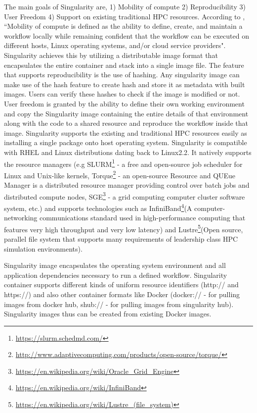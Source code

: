 The main goals of Singularity are, 1) Mobility of compute 2) Reproducibility 3) User Freedom 4) Support on existing traditional HPC resources. According to \cite{10.1371/journal.pone.0177459}, ``Mobility of compute is defined as the ability to define, create, and maintain a workflow locally while remaining confident that the workflow can be executed on different hosts, Linux operating systems, and/or cloud service providers". Singularity achieves this by utilizing a distributable image format that encapsulates the entire container and stack into a single image file. The feature that supports reproducibility is the use of hashing. Any singularity image can make use of the hash feature to create hash and store it as metadata with built images. Users can verify these hashes to check if the image is modified or not. User freedom is granted by the ability to define their own working environment and copy the Singularity image containing the entire details of that environment along with the code to a shared resource and reproduce the workflow inside that image. Singularity supports the existing and traditional HPC resources easily as installing a single package onto host operating system. Singularity is compatible with RHEL and Linux distributions dating back to Linux2.2. It natively supports the resource managers (e.g SLURM\footnote{\url{https://slurm.schedmd.com/}} - a free and open-source job scheduler for Linux and Unix-like kernels, Torque\footnote{\url{http://www.adaptivecomputing.com/products/open-source/torque/}} - an open-source Resource and QUEue Manager is a distributed resource manager providing control over batch jobs and distributed compute nodes, SGE\footnote{\url{https://en.wikipedia.org/wiki/Oracle_Grid_Engine}} - a grid computing computer cluster software system, etc.) and supports technologies such as InfiniBand\footnote{\url{https://en.wikipedia.org/wiki/InfiniBand}}(A computer-networking communications standard used in high-performance computing that features very high throughput and very low latency) and Lustre\footnote{\url{https://en.wikipedia.org/wiki/Lustre_(file_system)}}(Open source, parallel file system that supports many requirements of leadership class HPC simulation environments).

Singularity image encapsulates the operating system environment and all application dependencies necessary to run a defined workflow. Singularity container supports different kinds of uniform resource identifiers (http:// and https://) and also other container formats like Docker (docker:// - for pulling images from docker hub, shub:// - for pulling images from singularity hub). Singularity images thus can be created from existing Docker images.

